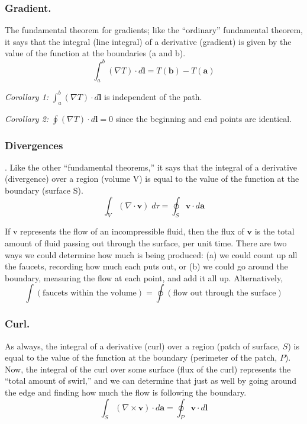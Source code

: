 \documentclass[../../../main.tex]{subfiles}
\begin{document}
\subsubsection{Gradient.} The fundamental theorem for gradients; like the “ordinary” fundamental theorem, it says that the integral (line integral) of a derivative (gradient) is given by the value of the function at the boundaries (a and b).
\begin{equation*}
    \int_{a}^{b}(\nabla T)\cdot d\mathbf{l}=T(\mathbf{b})-T(\mathbf{a})
\end{equation*}

\emph{Corollary 1:} $ \int_{a}^{b}(\nabla T)\cdot d\mathbf{l}$ is independent of the path.

\emph{Corollary 2:} $\oint (\nabla T)\cdot d\mathbf{l}=0 $ since the beginning and end points are identical.

\subsubsection{Divergences}.
Like the other “fundamental theorems,” it says that the integral of a derivative (divergence) over a region (volume V) is equal to the value of the function at the boundary (surface S).
\begin{equation*}
    \int_{V}(\nabla \cdot \mathbf{v})\;d\tau=\oint_{S}\mathbf{v}\cdot d\mathbf{a}
\end{equation*}

If v represents the flow of an incompressible fluid, then the flux of $\mathbf{v}$ is the total amount of fluid passing out through the surface, per unit time.  There are two ways we could determine how much is being produced: (a) we could count up all the faucets, recording how much each puts out, or (b) we could go around the boundary, measuring the ﬂow at each point, and add it all up. Alternatively,
\begin{equation*}
    \int (\text{faucets within the volume})=\oint (\text{ﬂow out through the surface})
\end{equation*}

\subsubsection{Curl.} As always, the integral of a derivative (curl) over a region (patch of surface, $S$) is equal to the value of the function at the boundary (perimeter of the patch, $P$). Now, the integral of the curl over some surface (flux of the curl) represents the “total amount of swirl,” and we can determine that just as well by going around the edge and finding how much the flow is following the boundary.
\begin{equation*}
    \int_{S}(\nabla \times \mathbf{v})\cdot d\mathbf{a}=\oint_{P}\mathbf{v}\cdot d\mathbf{l}
\end{equation*}
\end{document}

